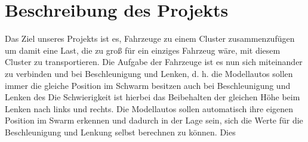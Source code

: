 \chapter{Beschreibung des Projekts}
Das Ziel unseres Projekts ist es, Fahrzeuge zu einem Cluster zusammenzufügen um damit eine Last, die zu groß für ein einziges Fahrzeug wäre, mit diesem Cluster zu transportieren. Die Aufgabe der Fahrzeuge ist es nun sich miteinander zu verbinden und bei Beschleunigung und Lenken, d. h. die Modellautos sollen immer die gleiche Position im Schwarm besitzen auch bei Beschleunigung und Lenken des  Die Schwierigkeit ist hierbei das Beibehalten der gleichen Höhe beim Lenken nach links und rechts. Die Modellautos sollen automatisch ihre eigenen Position im Swarm erkennen und dadurch in der Lage sein, sich die Werte für die Beschleunigung und Lenkung selbst berechnen zu können. Dies